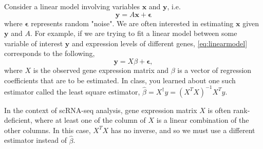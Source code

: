 \documentclass[11pt]{exam}
\begin{document}
\begin{questions} 
\question[16] 
Consider a linear model involving variables $\mathbf{x}$ and $\mathbf{y}$, i.e.
\begin{equation}
	\mathbf{y} = A\mathbf{x} + \mathbf{\epsilon}
	\label{eq:linearmodel}
\end{equation}
where $\mathbf{\epsilon}$ represents random "noise". We are often interested in estimating $\mathbf{x}$ given $\mathbf{y}$ and $A$. For example, if we are trying to fit a linear model between some variable of interest $\mathbf{y}$ and expression levels of different genes, \eqref{eq:linearmodel} corresponds to the following,
\begin{equation}
	\mathbf{y} = X\beta + \mathbf{\epsilon},
\end{equation}
where $X$ is the observed gene expression matrix and $\beta$ is a vector of regression coefficients that are to be estimated. In class, you learned about one such estimator called the least square estimator, $\hat{\beta} = X^{\dagger}y = (X^TX)^{-1}X^Ty$.

In the context of scRNA-seq analysis, gene expression matrix $X$ is often rank-deficient, where at least one of the column of $X$ is a linear combination of the other columns.
In this case, $X^TX$ has no inverse, and so we must use a different estimator instead of $\hat{\beta}$. 
\end{questions}
\end{document}
